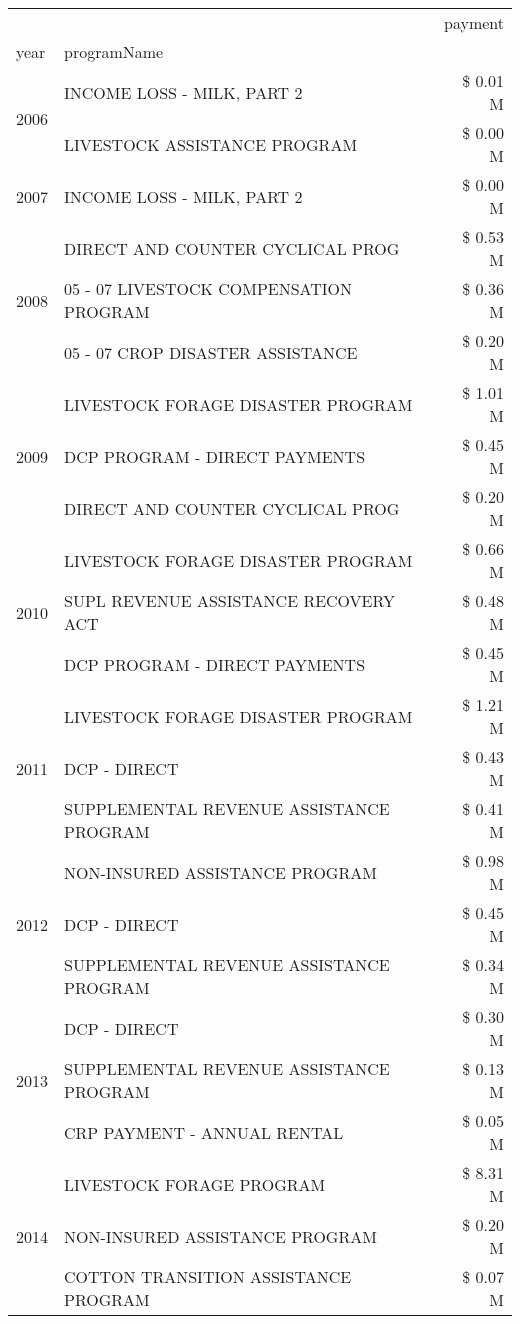 \begin{tabular}{llr}
\toprule
 &  & payment \\
year & programName &  \\
\midrule
\multirow[t]{2}{*}{2006} & INCOME LOSS - MILK, PART 2 & \$ 0.01 M \\
 & LIVESTOCK ASSISTANCE PROGRAM & \$ 0.00 M \\
\cline{1-3}
2007 & INCOME LOSS - MILK, PART 2 & \$ 0.00 M \\
\cline{1-3}
\multirow[t]{3}{*}{2008} & DIRECT AND COUNTER CYCLICAL PROG & \$ 0.53 M \\
 & 05 - 07 LIVESTOCK COMPENSATION PROGRAM & \$ 0.36 M \\
 & 05 - 07 CROP DISASTER ASSISTANCE & \$ 0.20 M \\
\cline{1-3}
\multirow[t]{3}{*}{2009} & LIVESTOCK FORAGE DISASTER  PROGRAM & \$ 1.01 M \\
 & DCP PROGRAM - DIRECT PAYMENTS & \$ 0.45 M \\
 & DIRECT AND COUNTER CYCLICAL PROG & \$ 0.20 M \\
\cline{1-3}
\multirow[t]{3}{*}{2010} & LIVESTOCK FORAGE DISASTER  PROGRAM & \$ 0.66 M \\
 & SUPL REVENUE ASSISTANCE RECOVERY ACT & \$ 0.48 M \\
 & DCP PROGRAM - DIRECT PAYMENTS & \$ 0.45 M \\
\cline{1-3}
\multirow[t]{3}{*}{2011} & LIVESTOCK FORAGE DISASTER PROGRAM & \$ 1.21 M \\
 & DCP - DIRECT & \$ 0.43 M \\
 & SUPPLEMENTAL REVENUE ASSISTANCE PROGRAM & \$ 0.41 M \\
\cline{1-3}
\multirow[t]{3}{*}{2012} & NON-INSURED ASSISTANCE PROGRAM & \$ 0.98 M \\
 & DCP - DIRECT & \$ 0.45 M \\
 & SUPPLEMENTAL REVENUE ASSISTANCE PROGRAM & \$ 0.34 M \\
\cline{1-3}
\multirow[t]{3}{*}{2013} & DCP - DIRECT & \$ 0.30 M \\
 & SUPPLEMENTAL REVENUE ASSISTANCE PROGRAM & \$ 0.13 M \\
 & CRP PAYMENT - ANNUAL RENTAL & \$ 0.05 M \\
\cline{1-3}
\multirow[t]{3}{*}{2014} & LIVESTOCK FORAGE PROGRAM & \$ 8.31 M \\
 & NON-INSURED ASSISTANCE PROGRAM & \$ 0.20 M \\
 & COTTON TRANSITION ASSISTANCE PROGRAM & \$ 0.07 M \\

\end{tabular}
